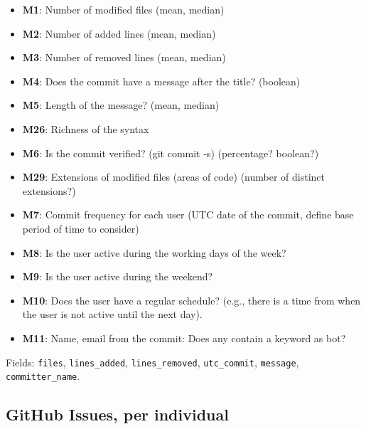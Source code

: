 \documentclass[a4paper, 12pt]{book}
\begin{document}
\begin{itemize}
    \item \textbf{M1}: Number of modified files (mean, median)
    \item \textbf{M2}: Number of added lines (mean, median)
    \item \textbf{M3}: Number of removed lines (mean, median)
    \item \textbf{M4}: Does the commit have a message after the title? (boolean)
    \item \textbf{M5}: Length of the message? (mean, median)
    \item \textbf{M26}: Richness of the syntax
    \item \textbf{M6}: Is the commit verified? (git commit -s) (percentage? boolean?)
    \item \textbf{M29}: Extensions of modified files (areas of code) (number of distinct extensions?)
    \item \textbf{M7}: Commit frequency for each user (UTC date of the commit, define base period of time to consider)
    \item \textbf{M8}: Is the user active during the working days of the week? 
    \item \textbf{M9}: Is the user active during the weekend?
    \item \textbf{M10}: Does the user have a regular schedule? (e.g., there is a time from when the user is not active until the next day).
    \item \textbf{M11}: Name, email from the commit: Does any contain a keyword as bot?
\end{itemize}

Fields: \texttt{files}, \texttt{lines\_added}, \texttt{lines\_removed}, \texttt{utc\_commit}, \texttt{message}, \texttt{committer\_name}.

\subsection{GitHub Issues, per individual}
\end{document}
